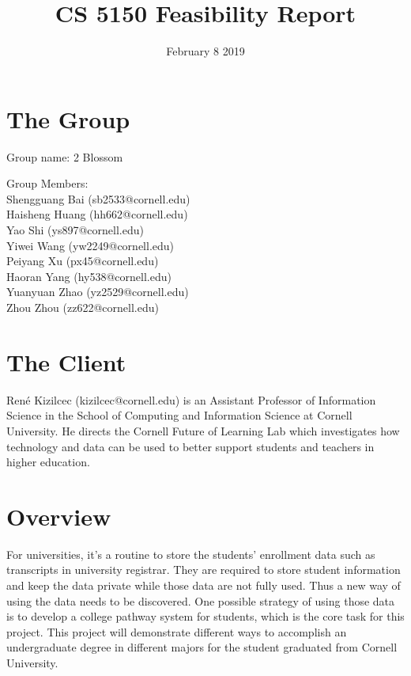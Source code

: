 \documentclass{article}
\title{CS 5150 Feasibility Report}
\author{}
\date{February 8 2019}
\begin{document}
\maketitle
\tableofcontents{}
\printindex{}
\pagebreak
\graphicspath{ {images/} }
\section{The Group}
Group name: 2 Blossom

\vspace{0.4cm}Group Members:\\
Shengguang Bai (sb2533@cornell.edu)\\
Haisheng Huang (hh662@cornell.edu)\\
Yao Shi (ys897@cornell.edu)\\
Yiwei Wang (yw2249@cornell.edu)\\
Peiyang Xu (px45@cornell.edu)\\
Haoran Yang (hy538@cornell.edu)\\
Yuanyuan Zhao (yz2529@cornell.edu)\\
Zhou Zhou (zz622@cornell.edu)
\section{The Client}
René Kizilcec (kizilcec@cornell.edu) is an Assistant Professor of Information Science in the School of Computing and Information Science at Cornell University. He directs the Cornell Future of Learning Lab which investigates how technology and data can be used to better support students and teachers in higher education.
\section{Overview}
For universities, it’s a routine to store the students’ enrollment data such as transcripts in university registrar. They are required to store student information and keep the data private while those data are not fully used. Thus a new way of using the data needs to be discovered. One possible strategy of using those data is to develop a college pathway system for students, which is the core task for this project. This project will demonstrate different ways to accomplish an undergraduate degree in different majors for the student graduated from Cornell University. 
\end{document}
